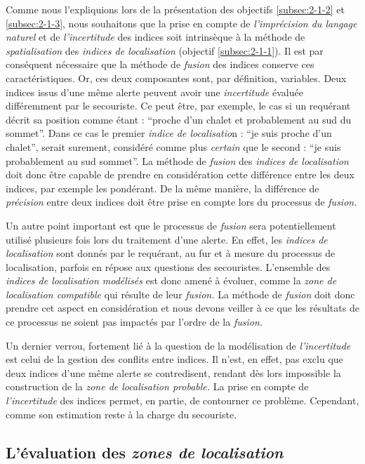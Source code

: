 Comme nous l'expliquions lors de la présentation des objectifs
\ref{subsec:2-1-2} et \ref{subsec:2-1-3}, nous souhaitons que la prise
en compte de \emph{l'imprécision du langage naturel} et de
\emph{l'incertitude} des indices soit intrinsèque à la méthode de
\emph{spatialisation} des \emph{indices de localisation} (objectif
\ref{subsec:2-1-1}). Il est par conséquent nécessaire que la méthode
de \emph{fusion} des indices conserve ces caractéristiques.
% 
Or, ces deux composantes sont, par définition, variables. Deux indices
issus d'une même alerte peuvent avoir une \emph{incertitude} évaluée
différemment par le secouriste. Ce peut être, par exemple, le cas si
un requérant décrit sa position comme étant : \enquote{proche d'un
  chalet et probablement au sud du sommet}. Dans ce cas le premier
\emph{indice de localisatio}n : \enquote{je suis proche d'un chalet},
serait surement, considéré comme plus \emph{certain} que le second :
\enquote{je suis probablement au sud sommet}. La méthode de
\emph{fusion} des \emph{indices de localisation} doit donc être
capable de prendre en considération cette différence entre les deux
indices, par exemple les pondérant. De la même manière, la différence
de \emph{précision} entre deux indices doit être prise en compte lors
du processus de \emph{fusion.}

Un autre point important est que le processus de \emph{fusion} sera
potentiellement utilisé plusieurs fois lors du traitement d'une
alerte. En effet, les \emph{indices de localisation} sont donnés par
le requérant, au fur et à mesure du processus de localisation, parfois
en répose aux questions des secouristes. L'ensemble des \emph{indices
  de localisation modélisés} est donc amené à évoluer, comme la
\emph{zone de localisation compatible} qui résulte de leur
\emph{fusion.} La méthode de \emph{fusion} doit donc prendre cet
aspect en considération et nous devons veiller à ce que les résultats
de ce processus ne soient pas impactés par l'ordre de la
\emph{fusion.}

Un dernier verrou, fortement lié à la question de la modélisation de
\emph{l'incertitude} est celui de la gestion des conflits entre
indices. Il n'est, en effet, pas exclu que deux indices d'une même
alerte se contredisent, rendant dès lors impossible la construction de
la \emph{zone de localisation probable.} La prise en compte de
\emph{l'incertitude} des indices permet, en partie, de contourner ce
problème. Cependant, comme son estimation reste à la charge du
secouriste.

\subsection{L'évaluation des \emph{zones de localisation}}
\label{subsec:2-1-5}

